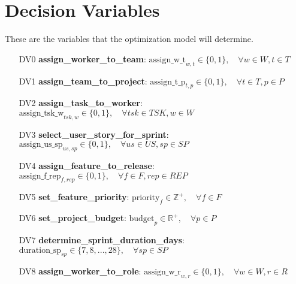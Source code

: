 \documentclass[11pt]{article}
\begin{document}
\section{Decision Variables}
These are the variables that the optimization model will determine.
\begin{itemize}
    \item[DV0] \textbf{assign\_worker\_to\_team}: $ \text{assign\_w\_t}_{w,t} \in \{0, 1\}, \quad \forall w \in W, t \in T $
    \item[DV1] \textbf{assign\_team\_to\_project}: $ \text{assign\_t\_p}_{t,p} \in \{0, 1\}, \quad \forall t \in T, p \in P $
    \item[DV2] \textbf{assign\_task\_to\_worker}: $ \text{assign\_tsk\_w}_{tsk,w} \in \{0, 1\}, \quad \forall tsk \in TSK, w \in W $
    \item[DV3] \textbf{select\_user\_story\_for\_sprint}: $ \text{assign\_us\_sp}_{us,sp} \in \{0, 1\}, \quad \forall us \in US, sp \in SP $
    \item[DV4] \textbf{assign\_feature\_to\_release}: $ \text{assign\_f\_rep}_{f,rep} \in \{0, 1\}, \quad \forall f \in F, rep \in REP $
    \item[DV5] \textbf{set\_feature\_priority}: $ \text{priority}_f \in \mathbb{Z}^+, \quad \forall f \in F $
    \item[DV6] \textbf{set\_project\_budget}: $ \text{budget}_p \in \mathbb{R}^+, \quad \forall p \in P $
    \item[DV7] \textbf{determine\_sprint\_duration\_days}: $ \text{duration\_sp}_{sp} \in \{7, 8, ..., 28\}, \quad \forall sp \in SP $
    \item[DV8] \textbf{assign\_worker\_to\_role}: $ \text{assign\_w\_r}_{w,r} \in \{0, 1\}, \quad \forall w \in W, r \in R $
\end{itemize}
\end{document}

